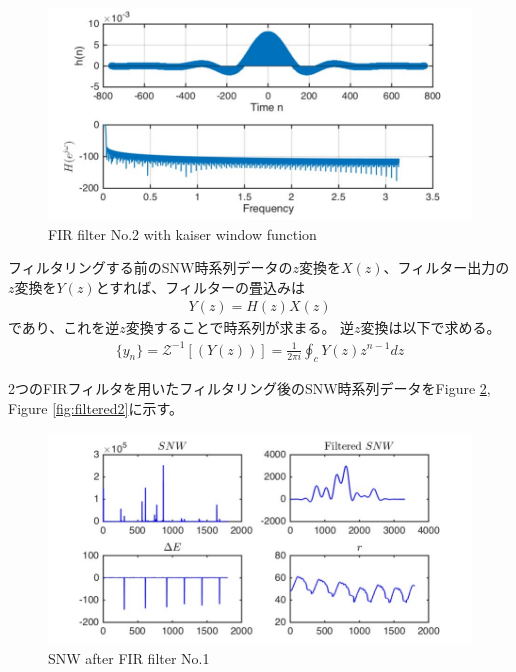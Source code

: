 \documentclass[twocolumn,oneside,a4paper]{article}
\begin{document}
\begin{figure}[htbp]
    \includegraphics[bb=0 0 432 216,width=1\columnwidth]{impulse1521.pdf}
    \caption{FIR filter No.2 with kaiser window function}
   \label{eq:fir_window2}
\end{figure}

フィルタリングする前のSNW時系列データの$z$変換を$X(z)$、フィルター出力の$z$変換を$Y(z)$とすれば、フィルターの畳込みは
\begin{eqnarray*}
	Y(z) = H(z) X(z)
\end{eqnarray*}
であり、これを逆$z$変換することで時系列が求まる。
逆$z$変換は以下で求める。
\begin{eqnarray*}
	\{y_n\} = \mathcal{Z}^{-1}[(Y(z))] = \frac{1}{2 \pi i} \oint_c Y(z) z^{n-1} dz
\end{eqnarray*}

2つのFIRフィルタを用いたフィルタリング後のSNW時系列データをFigure \ref{fig:filtered}, Figure \ref{fig:filtered2}に示す。

\begin{figure}[htbp]
    \includegraphics[bb=0 0 432 216,width=1\columnwidth]{gcodesim_filtered.pdf}
    \caption{SNW after FIR filter No.1}
   \label{fig:filtered}
\end{figure}
\end{document}
